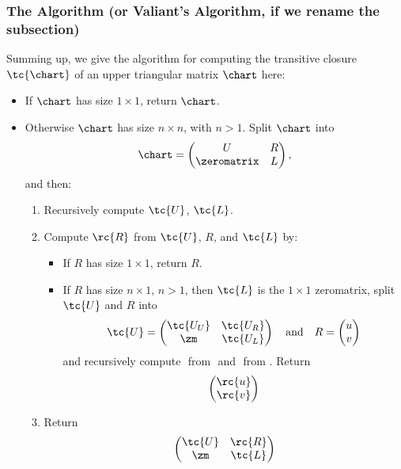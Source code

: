 \subsubsection{The Algorithm (or Valiant's Algorithm, if we rename the subsection)}
\label{Valiant-summing-up}
Summing up, we give the algorithm for computing the transitive closure $\tc{\chart}$ of an upper triangular matrix $\chart$ here:
\begin{itemize}
\item If $\chart$ has size $1 \times 1$, return $\chart$.
\item Otherwise $\chart$ has size $n \times n$, with $n > 1$. Split $\chart$ into
  \begin{equation*}
    \chart = 
    \begin{pmatrix}
      U           &  R \\
      \zeromatrix &  L
    \end{pmatrix},
  \end{equation*}
  and then: 
  \begin{enumerate}
  \item Recursively compute $\tc{U}$, $\tc{L}$.
  \item Compute $\rc{R}$ from $\tc{U}$, $R$, and $\tc{L}$ by:
    \begin{itemize}
    \item If $R$ has size $1 \times 1$, return $R$.
    \item If $R$ has size $n \times 1$, $n > 1$, then $\tc{L}$ is the $1\times 1$ zeromatrix, split $\tc{U}$ and $R$ into
      \begin{equation*}
        \tc{U} = 
        \begin{pmatrix}
          \tc{U_U} & \tc{U_R} \\
          \zm      & \tc{U_L} 
        \end{pmatrix} \quad \text{and}\quad
        R = 
        \begin{pmatrix}
          u \\
          v
        \end{pmatrix}
      \end{equation*}
        and recursively compute $ $ from $ $ and $ $ from $ $. Return
        \begin{equation*}
          \begin{pmatrix}
            \rc{u}\\
            \rc{v}
          \end{pmatrix}
        \end{equation*}
    \end{itemize}
    \item Return 
      \begin{equation*}
        \begin{pmatrix}
          \tc{U} & \rc{R} \\
          \zm    & \tc{L}
        \end{pmatrix}
      \end{equation*}
  \end{enumerate}
\end{itemize}

